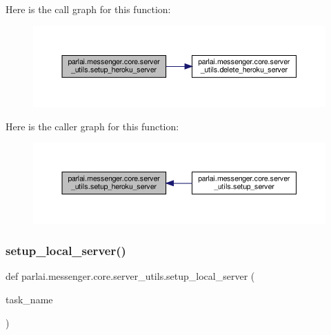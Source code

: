 Here is the call graph for this function\+:
\nopagebreak
\begin{figure}[H]
\begin{center}
\leavevmode
\includegraphics[width=350pt]{namespaceparlai_1_1messenger_1_1core_1_1server__utils_a3da4024deca88ca3c1ac20a2857b06db_cgraph}
\end{center}
\end{figure}
Here is the caller graph for this function\+:
\nopagebreak
\begin{figure}[H]
\begin{center}
\leavevmode
\includegraphics[width=350pt]{namespaceparlai_1_1messenger_1_1core_1_1server__utils_a3da4024deca88ca3c1ac20a2857b06db_icgraph}
\end{center}
\end{figure}
\mbox{\label{namespaceparlai_1_1messenger_1_1core_1_1server__utils_a3b993fcdfa397479c469c7d20dcbfd9d}} 
\subsubsection{\texorpdfstring{setup\+\_\+local\+\_\+server()}{setup\_local\_server()}}
{\footnotesize\ttfamily def parlai.\+messenger.\+core.\+server\+\_\+utils.\+setup\+\_\+local\+\_\+server (\begin{DoxyParamCaption}\item[{}]{task\+\_\+name }\end{DoxyParamCaption})}



